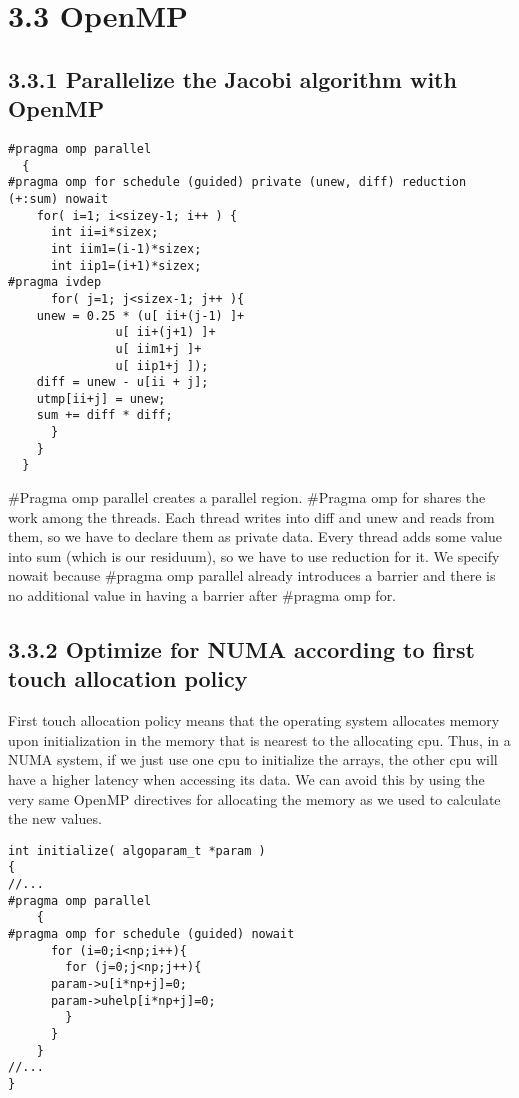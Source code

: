 \section*{3.3 OpenMP}
\label{3_3}


\subsection*{3.3.1 Parallelize the Jacobi algorithm with OpenMP}

\begin{lstlisting}
#pragma omp parallel
  {
#pragma omp for schedule (guided) private (unew, diff) reduction (+:sum) nowait
    for( i=1; i<sizey-1; i++ ) {
      int ii=i*sizex;
      int iim1=(i-1)*sizex;
      int iip1=(i+1)*sizex;
#pragma ivdep
      for( j=1; j<sizex-1; j++ ){
	unew = 0.25 * (u[ ii+(j-1) ]+
		       u[ ii+(j+1) ]+
		       u[ iim1+j ]+
		       u[ iip1+j ]);
	diff = unew - u[ii + j];
	utmp[ii+j] = unew;
	sum += diff * diff;
      }
    }
  }
\end{lstlisting}
\#Pragma omp parallel creates a parallel region. \#Pragma omp for shares the work among the threads. Each thread writes into diff and unew and reads from them, so we have to declare them as private data. Every thread adds some value into sum (which is our residuum), so we have to use reduction for it. We specify nowait because \#pragma omp parallel already introduces a barrier and there is no additional value in having a barrier after \#pragma omp for.

\subsection*{3.3.2 Optimize for NUMA according to first touch allocation policy}
First touch allocation policy means that the operating system allocates memory upon initialization in the memory that is nearest to the allocating cpu. Thus, in a NUMA system, if we just use one cpu to initialize the arrays, the other cpu will have a higher latency when accessing its data. We can avoid this by using the very same OpenMP directives for allocating the memory as we used to calculate the new values.
\begin{lstlisting}
int initialize( algoparam_t *param )
{
//...
#pragma omp parallel
    {
#pragma omp for schedule (guided) nowait
      for (i=0;i<np;i++){
    	for (j=0;j<np;j++){
	  param->u[i*np+j]=0;
	  param->uhelp[i*np+j]=0;
    	}
      }
    }
//...
}

\end{lstlisting}


